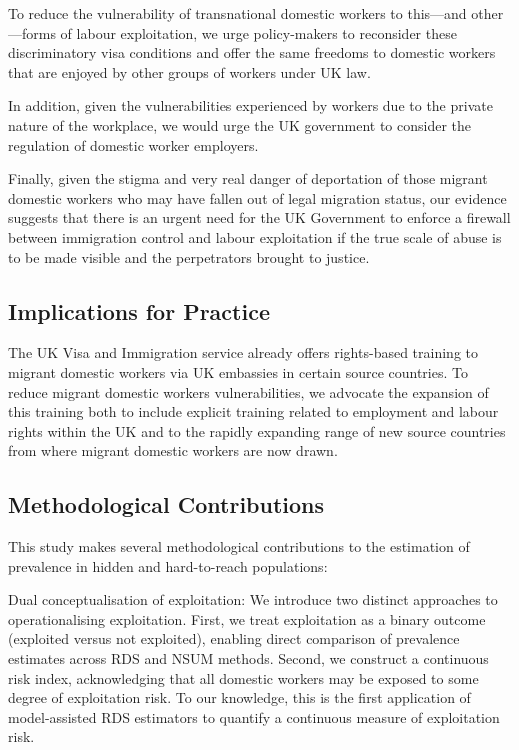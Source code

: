 \documentclass[
  12pt,
  letterpaper,
  DIV=11,
  numbers=noendperiod]{scrartcl}
\theoremstyle{plain}
\theoremstyle{definition}
\begin{document}
To reduce the vulnerability of transnational domestic workers to
this---and other---forms of labour exploitation, we urge policy-makers
to reconsider these discriminatory visa conditions and offer the same
freedoms to domestic workers that are enjoyed by other groups of workers
under UK law.

In addition, given the vulnerabilities experienced by workers due to the
private nature of the workplace, we would urge the UK government to
consider the regulation of domestic worker employers.

Finally, given the stigma and very real danger of deportation of those
migrant domestic workers who may have fallen out of legal migration
status, our evidence suggests that there is an urgent need for the UK
Government to enforce a firewall between immigration control and labour
exploitation if the true scale of abuse is to be made visible and the
perpetrators brought to justice.

\subsection{Implications for Practice}\label{implications-for-practice}

The UK Visa and Immigration service already offers rights-based training
to migrant domestic workers via UK embassies in certain source
countries. To reduce migrant domestic workers vulnerabilities, we
advocate the expansion of this training both to include explicit
training related to employment and labour rights within the UK and to
the rapidly expanding range of new source countries from where migrant
domestic workers are now drawn.

\subsection{Methodological
Contributions}\label{methodological-contributions}

This study makes several methodological contributions to the estimation
of prevalence in hidden and hard-to-reach populations:

Dual conceptualisation of exploitation: We introduce two distinct
approaches to operationalising exploitation. First, we treat
exploitation as a binary outcome (exploited versus not exploited),
enabling direct comparison of prevalence estimates across RDS and NSUM
methods. Second, we construct a continuous risk index, acknowledging
that all domestic workers may be exposed to some degree of exploitation
risk. To our knowledge, this is the first application of model-assisted
RDS estimators to quantify a continuous measure of exploitation risk.
\end{document}
